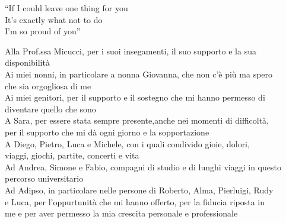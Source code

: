 


\begingroup
  \let\clearpage\endgroup
  \null{}
  \begin{minipage}{5.3in} 
  
    \begin{flushright}
      \begin{em}
        ``If I could leave one thing for you\\
        It's exactly what not to do\\
        I'm so proud of you''
      \end{em}

      \vspace{4cm}

      \begin{em}
        Alla Prof.ssa Micucci, per i suoi insegamenti, il suo supporto e la sua\\disponibilità\\[10pt]

        Ai miei nonni, in particolare a nonna Giovanna, che non c'è più ma spero\\che sia orgogliosa di me\\[10pt]

        Ai miei genitori, per il supporto e il sostegno che mi hanno permesso di\\diventare quello che sono\\[10pt]

        A Sara, per essere stata sempre presente,anche nei momenti di difficoltà,\\
        per il supporto che mi dà ogni giorno e la sopportazione\\[10pt]

        A Diego, Pietro, Luca e Michele, con i quali condivido gioie, dolori,\\
        viaggi, giochi, partite, concerti e vita\\[10pt]

        Ad Andrea, Simone e Fabio, compagni di studio e di lunghi viaggi in questo\\
        percorso universitario\\[10pt]
        
        Ad Adipso, in particolare nelle persone di Roberto, Alma, Pierluigi, Rudy\\ 
        e Luca, per l'oppurtunità che mi hanno offerto, per la fiducia riposta in\\
        me e per aver permesso la mia crescita personale e professionale


      \end{em} 
    \end{flushright}
  \end{minipage}
   \null
\endgroup